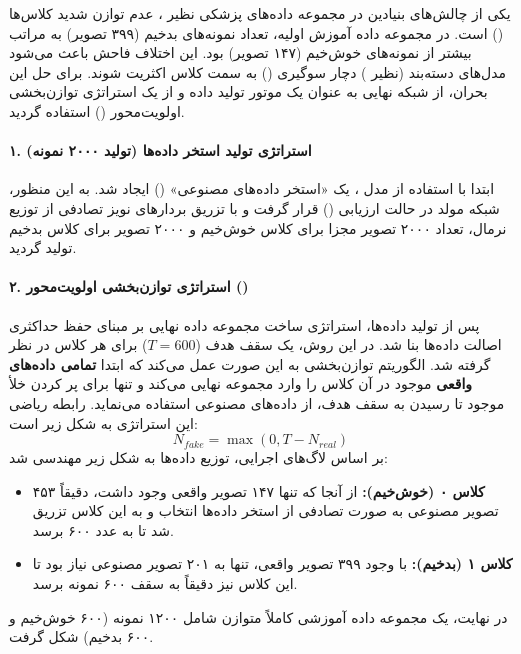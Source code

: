 \documentclass{article}
\begin{document}
یکی از چالش‌های بنیادین در مجموعه داده‌های پزشکی نظیر ، عدم توازن شدید کلاس‌ها () است. در مجموعه داده آموزش اولیه، تعداد نمونه‌های بدخیم (۳۹۹ تصویر) به مراتب بیشتر از نمونه‌های خوش‌خیم (۱۴۷ تصویر) بود. این اختلاف فاحش باعث می‌شود مدل‌های دسته‌بند (نظیر ) دچار سوگیری () به سمت کلاس اکثریت شوند. برای حل این بحران، از شبکه  نهایی به عنوان یک موتور تولید داده و از یک استراتژی توازن‌بخشی اولویت‌محور () استفاده گردید.

\paragraph{۱. استراتژی تولید استخر داده‌ها (تولید ۲۰۰۰ نمونه)}
ابتدا با استفاده از مدل ، یک «استخر داده‌های مصنوعی» () ایجاد شد. به این منظور، شبکه مولد در حالت ارزیابی () قرار گرفت و با تزریق بردارهای نویز تصادفی از توزیع نرمال، تعداد ۲۰۰۰ تصویر مجزا برای کلاس خوش‌خیم و ۲۰۰۰ تصویر برای کلاس بدخیم تولید گردید. 

\paragraph{۲. استراتژی توازن‌بخشی اولویت‌محور ()}
پس از تولید داده‌ها، استراتژی ساخت مجموعه داده نهایی بر مبنای حفظ حداکثری اصالت داده‌ها بنا شد. در این روش، یک سقف هدف ($T=600$) برای هر کلاس در نظر گرفته شد. الگوریتم توازن‌بخشی به این صورت عمل می‌کند که ابتدا \textbf{تمامی داده‌های واقعی} موجود در آن کلاس را وارد مجموعه نهایی می‌کند و تنها برای پر کردن خلأ موجود تا رسیدن به سقف هدف، از داده‌های مصنوعی استفاده می‌نماید. رابطه ریاضی این استراتژی به شکل زیر است:
$$ N_{fake} = \max(0, T - N_{real}) $$
بر اساس لاگ‌های اجرایی، توزیع داده‌ها به شکل زیر مهندسی شد:
\begin{itemize}
	\item \textbf{کلاس ۰ (خوش‌خیم):} از آنجا که تنها ۱۴۷ تصویر واقعی وجود داشت، دقیقاً ۴۵۳ تصویر مصنوعی به صورت تصادفی از استخر داده‌ها انتخاب و به این کلاس تزریق شد تا به عدد ۶۰۰ برسد.
	\item \textbf{کلاس ۱ (بدخیم):} با وجود ۳۹۹ تصویر واقعی، تنها به ۲۰۱ تصویر مصنوعی نیاز بود تا این کلاس نیز دقیقاً به سقف ۶۰۰ نمونه برسد.
\end{itemize}
در نهایت، یک مجموعه داده آموزشی کاملاً متوازن شامل ۱۲۰۰ نمونه (۶۰۰ خوش‌خیم و ۶۰۰ بدخیم) شکل گرفت.
\end{document}
